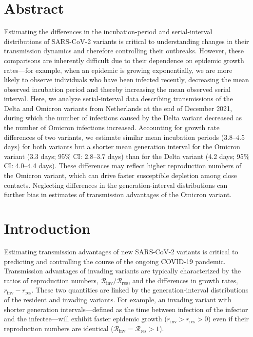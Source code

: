 \documentclass[12pt]{article}
\date{\today}
\newcommand{\Rx}[1]{\ensuremath{{\mathcal R}_{#1}}\xspace}
\newcommand{\Rres}{\Rx{\mathrm{res}}}
\newcommand{\Rinv}{\Rx{\mathrm{inv}}}
\newcommand{\rx}[1]{\ensuremath{{r}_{#1}}\xspace}
\newcommand{\rres}{\rx{\mathrm{res}}}
\newcommand{\rinv}{\rx{\mathrm{inv}}}
\begin{document}
\begin{flushleft}{
	\Large
	\textbf{}
}
\bigskip

\section*{Abstract}

Estimating the differences in the incubation-period and serial-interval distributions of SARS-CoV-2 variants is critical to understanding changes in their transmission dynamics and therefore controlling their outbreaks.
However, these comparisons are inherently difficult due to their dependence on epidemic growth rates---for example, when an epidemic is growing exponentially, we are more likely to observe individuals who have been infected recently, decreasing the mean observed incubation period and thereby increasing the mean observed serial interval.
Here, we analyze serial-interval data describing transmissions of the Delta and Omicron variants from Netherlands at the end of December 2021, during which the number of infections caused by the Delta variant decreased as the number of Omicron infections increased. 
Accounting for growth rate differences of two variants, we estimate similar mean incubation periods (3.8--4.5 days) for both variants but a shorter mean generation interval for the Omicron variant (3.3 days; 95\% CI: 2.8--3.7 days) than for the Delta variant (4.2 days; 95\% CI: 4.0--4.4 days).
These differences may reflect higher reproduction numbers of the Omicron variant, which can drive faster susceptible depletion among close contacts.
Neglecting differences in the generation-interval distributions can further bias in estimates of transmission advantages of the Omicron variant.

\end{flushleft}

\pagebreak

\section{Introduction}

Estimating transmission advantages of new SARS-CoV-2 variants is critical to predicting and controlling the course of the ongoing COVID-19 pandemic.
Transmission advantages of invading variants are typically characterized by the ratios of reproduction numbers, $\Rinv/\Rres$, and the differences in growth rates, $\rinv-\rres$.
These two quantities are linked by the generation-interval distributions of the resident and invading variants.
For example, an invading variant with shorter generation intervals---defined as the time between infection of the infector and the infectee---will exhibit faster epidemic growth ($\rinv > \rres > 0$) even if their reproduction numbers are identical ($\Rinv = \Rres > 1$).
\end{document}

